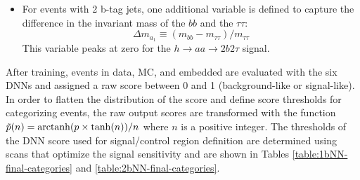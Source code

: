 \begin{itemize}
    \item For events with 2 b-tag jets, one additional variable is defined to capture the difference in the invariant mass of the $bb$ and the $\tau\tau$:
        \begin{equation}
            \Delta m_{a_1} \equiv (m_{bb} - m_{\tau\tau})/{m_{\tau\tau}}
        \end{equation}
    This variable peaks at zero for the $h\rightarrow aa \rightarrow 2b2\tau$ signal.
\end{itemize}

After training, events in data, MC, and embedded are evaluated with the six DNNs and assigned a raw score between 0 and 1 (background-like or signal-like). In order to flatten the distribution of the score and define score thresholds for categorizing events, the raw output scores are transformed with the function $\tilde{p}(n) = \operatorname{arctanh}(p \times \tanh(n))/n$ where $n$ is a positive integer. The thresholds of the DNN score used for signal/control region definition are determined using scans that optimize the signal sensitivity and are shown in Tables \ref{table:1bNN-final-categories} and \ref{table:2bNN-final-categories}.

